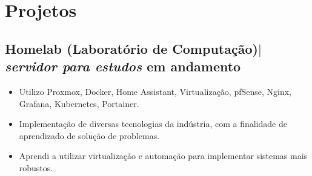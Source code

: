 \documentclass[11pt]{article} %
\begin{document}
\section{Projetos}
\subsection{Homelab (Laboratório de Computação)$|$ \normalfont\textit{servidor para estudos} \hfill em andamento}
\begin{itemize}
  \item Utilizo Proxmox, Docker, Home Assistant, Virtualização, pfSense, Nginx, Grafana, Kubernetes, Portainer.
  \item Implementação de diversas tecnologias da indústria, com a finalidade de aprendizado de solução de problemas. 
  \item Aprendi a utilizar virtualização e automação para implementar sistemas mais robustos.
\end{itemize}
\end{document}
